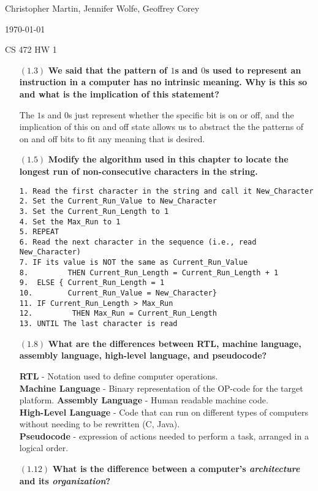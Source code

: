 \documentclass[letterpaper,10pt,titlepage]{article}
\def\name{Christopher Martin, Jennifer Wolfe, Geoffrey Corey}
\begin{document}
\hfill \name

\hfill \today

\hfill CS 472 HW 1

\begin{enumerate}
\item[$(1.3)$] \textbf{We said that the pattern of $1$s and $0$s used to represent an instruction
  in a computer has no intrinsic meaning. Why is this so and what is the implication of
  this statement?}

  The $1$s and $0$s just represent whether the specific bit is on or off, and the implication of this on and off state allows us to abstract the the patterns of on and off bits to fit any meaning that is desired.
  
\item[$(1.5)$] \textbf{Modify the algorithm used in this chapter to locate the longest run of
  non-consecutive characters in the string.}
\begin{verbatim}  
1. Read the first character in the string and call it New_Character
2. Set the Current_Run_Value to New_Character
3. Set the Current_Run_Length to 1
4. Set the Max_Run to 1
5. REPEAT
6. Read the next character in the sequence (i.e., read New_Character)
7. IF its value is NOT the same as Current_Run_Value
8.         THEN Current_Run_Length = Current_Run_Length + 1
9.  ELSE { Current_Run_Length = 1
10.        Current_Run_Value = New_Character}
11. IF Current_Run_Length > Max_Run
12.         THEN Max_Run = Current_Run_Length
13. UNTIL The last character is read 
\end{verbatim}
  
\item[$(1.8)$] \textbf{What are the differences between RTL, machine language, assembly language,
  high-level language, and pseudocode?}
  
  \textbf{RTL} - Notation used to define computer operations.\\
  \textbf{Machine Language} - Binary representation of the OP-code for the target platform.
  \textbf{Assembly Language} - Human readable machine code.\\ 
  \textbf{High-Level Language} - Code that can run on different types of computers without needing to be rewritten (C, Java).\\
  \textbf{Pseudocode} - expression of actions needed to perform a task, arranged in a logical order.
  
\item[$(1.12)$] \textbf{What is the difference between a computer's \textit{architecture} and its
  \textit{organization}?}
  

\end{enumerate}
\end{document}
